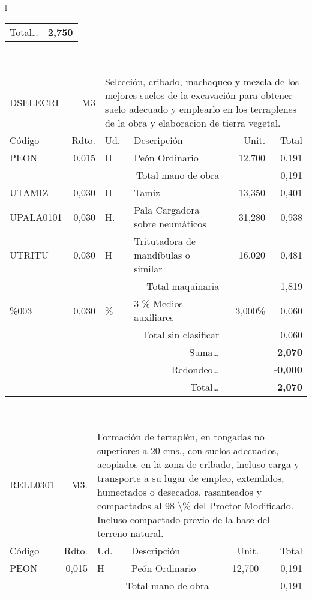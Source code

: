 \documentclass{book}%
\begin{document}
\begin{longtable}{l}
\begin{tabular}{l r l p{60mm} r r}
\multicolumn{4}{r}{Total\ldots}&\multicolumn{2}{r}{\textbf{     2,750}}\\%
\end{tabular}\\%
\begin{tabular}{l r l p{60mm} r r}%
DSELECRI&M3&\multicolumn{4}{p{95mm}}{Selección, cribado, machaqueo y mezcla de los mejores suelos de la excavación para obtener suelo adecuado y emplearlo en los terraplenes de la obra y elaboracion de tierra vegetal.}\\%
Código&Rdto.&Ud.&Descripción&Unit.&Total\\%
\hline%
PEON&     0,015&H&Peón Ordinario&    12,700&     0,191\\%
\multicolumn{4}{r}{Total mano de obra}&&     0,191\\%
UTAMIZ&     0,030&H&Tamiz&    13,350&     0,401\\%
UPALA0101&     0,030&H.&Pala Cargadora sobre neumáticos&    31,280&     0,938\\%
UTRITU&     0,030&H&Tritutadora de mandíbulas o similar&    16,020&     0,481\\%
\multicolumn{4}{r}{Total maquinaria}&&     1,819\\%
\%003&     0,030&\%&3 \% Medios auxiliares&     3,000\%&     0,060\\%
\multicolumn{4}{r}{Total sin clasificar}&&     0,060\\%
\multicolumn{4}{r}{Suma\ldots}&\multicolumn{2}{r}{\textbf{     2,070}}\\%
\multicolumn{4}{r}{Redondeo\ldots}&\multicolumn{2}{r}{\textbf{    {-}0,000}}\\%
\multicolumn{4}{r}{Total\ldots}&\multicolumn{2}{r}{\textbf{     2,070}}\\%
\end{tabular}\\%
\begin{tabular}{l r l p{60mm} r r}%
RELL0301&M3.&\multicolumn{4}{p{95mm}}{Formación de terraplén, en tongadas no superiores a 20 cms., con suelos adecuados, acopiados en la zona de cribado, incluso carga y transporte a su lugar de empleo, extendidos, humectados o desecados, rasanteados y compactados al 98 \textbackslash{}\% del Proctor Modificado. Incluso compactado previo de la base del terreno natural.}\\%
Código&Rdto.&Ud.&Descripción&Unit.&Total\\%
\hline%
PEON&     0,015&H&Peón Ordinario&    12,700&     0,191\\%
\multicolumn{4}{r}{Total mano de obra}&&     0,191\\%

\end{tabular}
\end{longtable}
\end{document}

